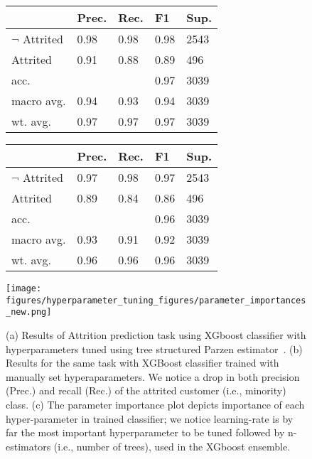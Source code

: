 \begin{figure*}[!ht]
    \begin{minipage}{0.28\textwidth}
        \centering
        \begin{tabular}{p{1.3cm}p{0.4cm}p{0.4cm}p{0.4cm}p{0.4cm}}
            \toprule
            {} &  Prec. &  Rec. &  F1 &   Sup. \\
            \midrule
            $\neg$ Attrited &0.98& 0.98& 0.98&2543\\
            Attrited & 0.91& 0.88& 0.89&496\\
            acc.          & & & 0.97&3039\\
            macro avg.         & 0.94& 0.93& 0.94&3039\\
            wt. avg.      & 0.97& 0.97& 0.97&3039\\
        \bottomrule
        \end{tabular}
        \label{tab:hyp_tuning}
    \end{minipage}
    \hfill
    \begin{minipage}{0.28\textwidth}
        \centering
        \begin{tabular}{p{1.3cm}p{0.4cm}p{0.4cm}p{0.4cm}p{0.4cm}}
            \toprule
            {} &  Prec. &  Rec. &  F1 &   Sup. \\
            \midrule
            $\neg$ Attrited & 0.97& 0.98& 0.97&2543 \\
            Attrited & 0.89& 0.84& 0.86&496 \\
            acc.          & & & 0.96&3039 \\
            macro avg.         & 0.93&0.91 & 0.92&3039 \\
            wt. avg.      & 0.96& 0.96& 0.96&3039 \\
            \bottomrule
        \end{tabular}
    \label{tab:no_hyp_tuning}
    \end{minipage}
    \hfill
    \begin{minipage}{0.42\textwidth}
    \centering
    \texttt{[image: figures/hyperparameter\_tuning\_figures/parameter\_importances\_new.png]}
    \label{fig:hyp_param_importance}
    \end{minipage}
    \caption{(a) Results of Attrition prediction task using XGboost classifier with hyperparameters tuned using tree structured Parzen estimator~\cite{bergstra2011algorithms,bergstra2013making}. (b) Results for the same task with XGBoost classifier trained with manually set hyperaparameters. We notice a drop in both precision (Prec.) and recall (Rec.) of the attrited customer (i.e., minority) class. (c) The parameter importance plot depicts importance of each hyper-parameter in trained classifier; we notice learning-rate is by far the most important hyperparameter to be tuned followed by n-estimators (i.e., number of trees), used in the XGboost ensemble. }
    \label{fig:hyp_optimization_plots}
\end{figure*}

